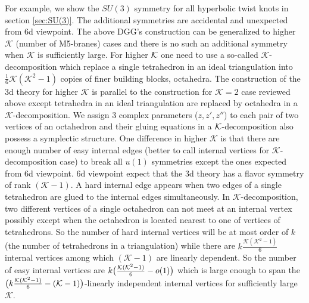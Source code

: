 \documentclass[a4paper,11pt]{article}
\def\CK{{\cal K}}
\begin{document}
For example, we show  the $SU(3)$ symmetry for all hyperbolic twist knots in section  \ref{sec:SU(3)}.
The  additional symmetries are accidental and unexpected from 6d viewpoint. 
The above DGG's construction can be  generalized to higher $\mathcal{K}$ (number of M5-branes) cases \cite{Dimofte:2014zga} and  there is no such an additional symmetry when  $\mathcal{K}$ is sufficiently large. 
For higher $\CK$ one need to use a so-called $\mathcal{K}$-decomposition which replace a single tetrahedron in an ideal triangulation into  $\frac{1}6 \mathcal{K}(\mathcal{K}^2-1)$ copies of finer building blocks, octahedra. The construction of the 3d theory for higher $\mathcal{K}$ is parallel to the construction for $\mathcal{K}=2$ case reviewed above except tetrahedra in an ideal triangulation are replaced by  octahedra in a $\mathcal{K}$-decomposition. 
We  assign 3 complex parameters ($z,z',z''$) to each pair of two vertices of an octahedron and their gluing equations  in a $\CK$-decomposition also possess a symplectic structure. One  difference in higher $\mathcal{K}$ is that there are enough number of easy internal edges (better to call internal vertices for $\mathcal{K}$-decomposition case) to break all $u(1)$ symmetries except the ones expected from 6d viewpoint. 6d viewpoint expect that the 3d theory has a flavor symmetry of rank $(\mathcal{K}-1)$.  A hard internal edge  appears when two edges of a single tetrahedron are glued to the internal edges simultaneously. In  $\mathcal{K}$-decomposition, two different vertices of a single octahedron can not meet at an internal vertex possibly except when the octahedron is located nearest  to one of  vertices of tetrahedrons.  So the number of hard internal vertices will be at most order of $k$ (the number of tetrahedrons in a triangulation) while there are $k \frac{\mathcal{K}(\mathcal{K}^2-1)}6$ internal vertices among which  $(\mathcal{K}-1)$ are linearly dependent. So the number of easy internal vertices are  $k \big{(} \frac{\mathcal{K}(\mathcal{K}^2-1)}6- o(1) \big{)}$ which is large enough to span the  $\big{(} k \frac{\mathcal{K}(\mathcal{K}^2-1)}6 - (\mathcal{K}-1)  \big{)}$-linearly independent internal vertices for sufficiently large $\mathcal{K}$.
\end{document}
